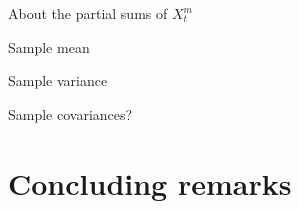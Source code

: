 \documentclass[12pt]{article}
\begin{document}
About the partial sums of $X_t^m$

Sample mean

Sample variance

Sample covariances?





\section{Concluding remarks}


\newpage
\end{document}
